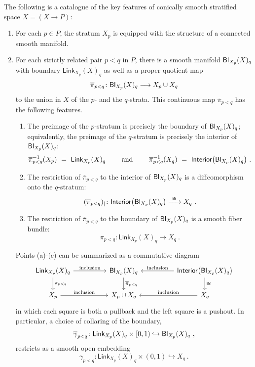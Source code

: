 \documentclass{article}
\newcommand{\msf}[1]{\mathsf{#1}}
\newcommand{\link}{\msf{Link}}
\newcommand{\ov}{\overline}
\newcommand{\xra}{\xrightarrow}
\theoremstyle{definition}
\begin{document}
The following is a catalogue of the key features of conically smooth stratified space $X = (X\to P)$:
\begin{enumerate}
\item
For each $p\in P$, the stratum $X_p$ is equipped with the structure of a connected smooth manifold.  


\item
For each strictly related pair $p<q$ in $P$, there is a smooth manifold ${\sf Bl}_{X_p}(X)_q$ with boundary $\link_{X_p}(X)_q$ as well as a proper quotient map
\[
\ov{\pi}_{p<q} \colon {\sf Bl}_{X_p}(X)_q \longrightarrow X_p \cup X_q
\]
to the union in $X$ of the $p$- and the $q$-strata.  
This continuous map $\ov{\pi}_{p<q}$ has the following features.
\begin{enumerate}

\item
The preimage of the $p$-stratum is precisely the boundary of ${\sf Bl}_{X_p}(X)_q$; equivalently, the preimage of the $q$-stratum is precisely the interior of ${\sf Bl}_{X_p}(X)_q$:
\[
\ov{\pi}_{p<q}^{-1}(X_p) ~=~ \link_{X_p}(X)_q
\qquad\text{ and }\qquad
\ov{\pi}_{p<q}^{-1}(X_q) ~=~ {\sf Interior}\bigl( {\sf Bl}_{X_p}(X)_q\bigr)
~.
\]

\item
The restriction of $\ov{\pi}_{p<q}$ to the interior of ${\sf Bl}_{X_p}(X)_q$ is a diffeomorphism onto the $q$-stratum:
\[
(\ov{\pi}_{p<q})_{|} \colon {\sf Interior}\bigl({\sf Bl}_{X_p}(X)_q\bigr)
\xra{~\cong~}
X_q
~.
\]

\item
The restriction of $\ov{\pi}_{p<q}$ to the boundary of ${\sf Bl}_{X_p}(X)_q$ is a smooth fiber bundle:
\[
\pi_{p<q} \colon 
\link_{X_p}(X)_q
\longrightarrow
X_q
~.
\]

\end{enumerate}
Points (a)-(c) can be summarized as a commutative diagram
$$\begin{tikzcd}
    \link_{X_p}(X)_q \arrow[d,"\pi_{p<q}"] \arrow[rr,"\rm inclusion"]
    &&
    {\sf Bl}_{X_p}(X)_q \arrow[d,"{\ov{\pi}}_{p<q}"]
    &&
    {\sf Interior} \bigl( {\sf Bl}_{X_p}(X)_q \bigr) \arrow[ll,swap,"\rm inclusion"] \arrow[d,"\cong"]
    \\
    X_p \arrow[rr,"\rm inclusion"]
    &&
    X_p \cup X_q
    &&
    X_q \arrow[ll,swap,"\rm inclusion"]
\end{tikzcd}$$
in which each square is both a pullback and the left square is a pushout.  
In particular, a choice of collaring of the boundary,
\[
\ov{\gamma}_{p<q}\colon \link_{X_p}(X)_q \times [0,1)
\hookrightarrow
{\sf Bl}_{X_p}(X)_q
~,
\]
restricts as a smooth open embedding
\begin{equation}\label{e3}
\gamma_{p<q}\colon 
\link_{X_p}(X)_q \times (0,1)
\hookrightarrow
X_q
~.
\end{equation}



\end{enumerate}
\end{document}
